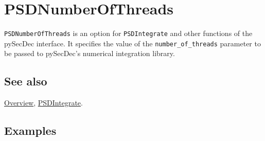 \documentclass[../FeynHelpersManual.tex]{subfiles}
\begin{document}
\hypertarget{psdnumberofthreads}{
\section{PSDNumberOfThreads}\label{psdnumberofthreads}}

\texttt{PSDNumberOfThreads} is an option for \texttt{PSDIntegrate} and
other functions of the pySecDec interface. It specifies the value of the
\texttt{number_of_threads} parameter to be passed to pySecDec's
numerical integration library.

\subsection{See also}

\hyperlink{toc}{Overview}, \hyperlink{psdintegrate}{PSDIntegrate}.

\subsection{Examples}
\end{document}
